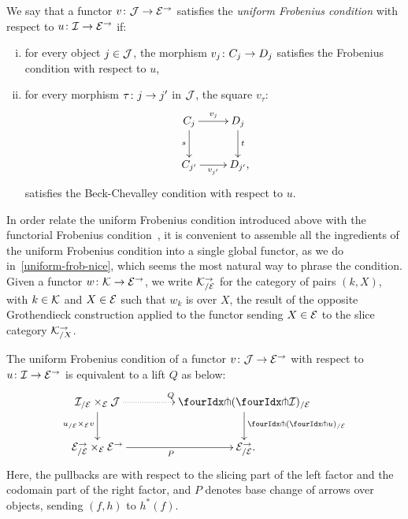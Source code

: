 \documentclass[reqno,10pt,a4paper,oneside,draft]{amsart}
\begin{document}
\begin{definition} \label{def:uniFrobcond}
We say that a functor $v \co \cal{J} \to \catE^\to$ satisfies the \emph{uniform Frobenius condition} with respect to $u \co \cal{I} \to \cal{E}^\to$ if:
\begin{enumerate}[(i)]
\item for every object $j \in \cal{J}$, the morphism $v_j \co C_j \to D_j$ satisfies the Frobenius condition with respect to $u$,
\item for every morphism $\tau \co j \to j'$ in $\cal{J}$, the square $v_\tau$:
\[
\xymatrix{
  C_j
  \ar[r]^{v_j}
  \ar[d]_{s}
&
  D_j
  \ar[d]^{t}
\\
  C_{j'}
  \ar[r]_-{v_{j'}}
&
  D_{j'}
\rlap{,}}
\]
satisfies the Beck-Chevalley condition with respect to $u$.
\end{enumerate}
\end{definition}

In order relate the uniform Frobenius condition introduced above with the functorial Frobenius condition~\cite{garner:topological-simplicial}, it is convenient to assemble all the ingredients of the uniform Frobenius condition into a single global functor, as we do in~\cref{uniform-frob-nice}, which seems the most natural way to phrase the condition.
Given a functor $w \co \cal{K} \to \cal{E}^\to$, we write $\cal{K}_{/\cal{E}}^{\to}$ for the category of pairs $(k, X)$, with $k \in \cal{K}$ and $X \in \cal{E}$ such that $w_k$ is over $X$, \ie the result of the opposite Grothendieck construction applied to the functor sending $X \in \cal{E}$ to the slice category $\cal{K}_{/X}^{\to}$.

\begin{proposition}
\label{uniform-frob-nice}
The uniform Frobenius condition of a functor $v \co \cal{J} \to \cal{E}^\to$ with respect to $u \co \cal{I} \to \cal{E}^\to$ is equivalent to a lift $Q$ as below:
\begin{equation} \label{uniform-frob-nice:lift}
\begin{gathered}
\xymatrix@C+2em{
  \cal{I}_{/\cal{E}} \times_{\cal{E}} \cal{J}
  \ar@{.>}[r]^{Q}
  \ar[d]_{u_{/\cal{E}} \times_{\cal{E}} v}
&
  \liftl{(\liftr{\cal{I}})}_{/\cal{E}}
  \ar[d]^{\liftl{(\liftr{u})}_{/\cal{E}}}
\\
  \cal{E}^\to_{/\cal{E}} \times_{\cal{E}} \cal{E}^\to
  \ar[r]_{P}
&
  \cal{E}_{/\cal{E}}^\to
\rlap{.}}
\end{gathered}
\end{equation}
Here, the pullbacks are with respect to the slicing part of the left factor and the codomain part of the right factor, and $P$ denotes base change of arrows over objects, sending $(f, h)$ to $h^*(f)$.
\end{proposition}
\end{document}
